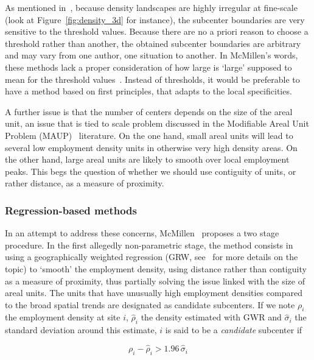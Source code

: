 As mentioned in~\cite{Anas:1998}, because density landscapes are highly
irregular at fine-scale (look at Figure~\ref{fig:density_3d} for instance), the
subcenter boundaries are very sensitive to the threshold values. Because there
are no a priori reason to choose a threshold rather than another, the obtained
subcenter boundaries are arbitrary and may vary from one author, one situation
to another. In McMillen's words, these methods lack a proper consideration of
how large is `large' supposed to mean for the threshold
values~\cite{McMillen:2003}. Instead of thresholds, it would be preferable to
have a method based on first principles, that adapts to the local specificities.

A further issue is that the number of centers depends on the size of the areal
unit, an issue that is tied to scale problem discussed in the Modifiable Areal
Unit Problem (MAUP)~\cite{Openshaw:1984} literature. On the one hand, small
areal units will lead to several low employment density units in otherwise very
high density areas. On the other hand, large areal units are likely to smooth
over local employment peaks. This begs the question of whether we should use
contiguity of units, or rather distance, as a measure of proximity.


\subsubsection{Regression-based methods}
\label{ssub:regression_based_methods}

In an attempt to address these concerns, McMillen~\cite{McMillen:2001} proposes
a two stage procedure. In the first allegedly non-parametric stage, the method
consists in using a geographically weighted regression (GRW,
see~\cite{Brunsdon:1998} for more details on the topic) to `smooth' the
employment density, using distance rather than contiguity as a measure of
proximity, thus partially solving the issue linked with the size of areal units.
The units that have unusually high employment densities
compared to the broad spatial trends are designated as candidate subcenters. If we note $\rho_i$ the employment
density at site $i$, $\hat{\rho}_i$ the density estimated with GWR and
$\hat{\sigma}_i$ the standard deviation around this estimate, $i$ is said to be
a \emph{candidate} subcenter if 

\begin{equation*}
    \rho_i - \hat{\rho}_i > 1.96\,\hat{\sigma}_i
\end{equation*}

